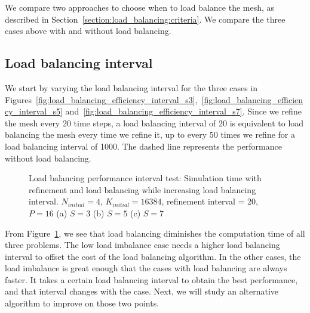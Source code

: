 We compare two approaches to choose when to load balance the mesh, as described in
Section~\ref{section:load_balancing:criteria}. We compare the three cases above with and without
load balancing.

\subsection{Load balancing interval}\label{subsection:results:load_balancing_performance:interval}

We start by varying the load balancing interval for the three cases in
Figures~\ref{fig:load_balancing_efficiency_interval_s3},~\ref{fig:load_balancing_efficiency_interval_s5}
and~\ref{fig:load_balancing_efficiency_interval_s7}. Since we refine the mesh every 20 time steps, a
load balancing interval of 20 is equivalent to load balancing the mesh every time we refine it, up
to every 50 times we refine for a load balancing interval of 1000. The dashed line represents the
performance without load balancing.

\begin{figure}[H]
    \begin{adjustwidth}{-0.5in}{-0.5in}
    \centering
    \hfill
    \hfill
    \end{adjustwidth}
    \caption{Load balancing performance interval test: Simulation time with refinement and load balancing while increasing load balancing interval. \(N_{initial} = 4\), \(K_{initial} = 16384\), refinement interval = 20, \(P = 16\) (a) \(S = 3\) (b) \(S = 5\) (c) \(S = 7\)}\label{fig:load_balancing_efficiency_interval}
\end{figure}

From Figure~\ref{fig:load_balancing_efficiency_interval}, we see that load balancing diminishes the
computation time of all three problems. The low load imbalance case needs a higher load balancing
interval to offset the cost of the load balancing algorithm. In the other cases, the load imbalance
is great enough that the cases with load balancing are always faster. It takes a certain load
balancing interval to obtain the best performance, and that interval changes with the case. Next, we
will study an alternative algorithm to improve on those two points.


